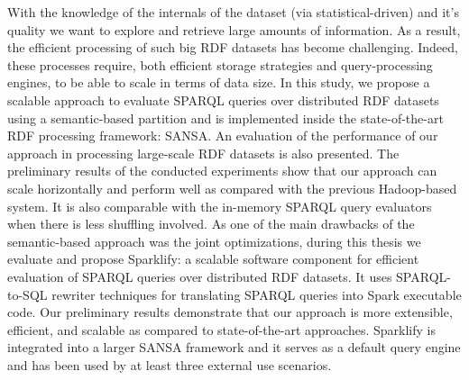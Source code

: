 With the knowledge of the internals of the dataset (via statistical-driven) and it's quality we want to explore and retrieve large amounts of information.
As a result, the efficient processing of such big RDF datasets has become challenging.
Indeed, these processes require, both efficient storage strategies and query-processing engines, to be able to scale in terms of data size.
In this study, we propose a scalable approach to evaluate SPARQL queries over distributed RDF datasets using a semantic-based partition and is implemented inside the state-of-the-art RDF processing framework: SANSA.
An evaluation of the performance of our approach in processing large-scale RDF datasets is also presented. 
The preliminary results of the conducted experiments show that our approach can scale horizontally and perform well as compared with the previous Hadoop-based system.
It is also comparable with the in-memory SPARQL query evaluators when there is less shuffling involved.
As one of the main drawbacks of the semantic-based approach was the joint optimizations, during this thesis we evaluate and propose Sparklify: a scalable software component for efficient evaluation of SPARQL queries over distributed RDF datasets. 
It uses SPARQL-to-SQL rewriter techniques for translating SPARQL queries into Spark executable code.
Our preliminary results demonstrate that our approach is more extensible, efficient, and scalable as compared to state-of-the-art approaches.
Sparklify is integrated into a larger SANSA framework and it serves as a default query engine and has been used by at least three external use scenarios.